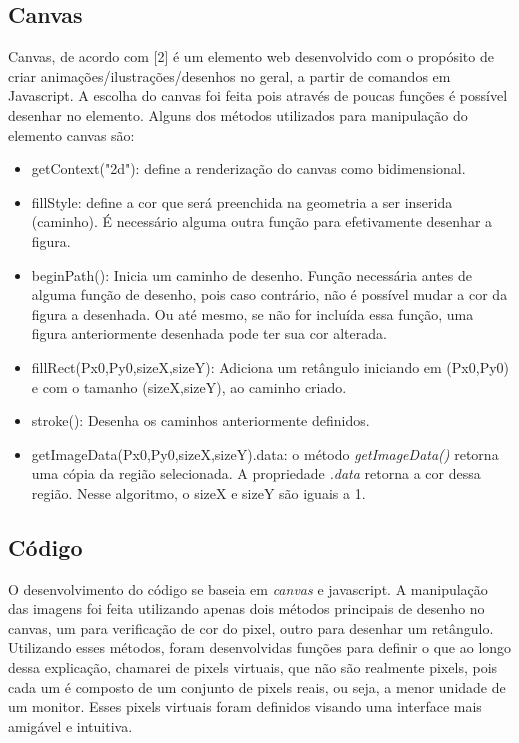 \documentclass[conference,harvard,brazil,english]{sbatex}
\begin{document}
\subsection{Canvas}
Canvas, de acordo com [2] é um elemento web desenvolvido com o propósito de criar animações/ilustrações/desenhos no geral, a partir de comandos em Javascript. A escolha do canvas foi feita pois através de poucas funções é possível desenhar no elemento.
Alguns dos métodos utilizados para manipulação do elemento canvas são:
\begin{itemize}
\item getContext("2d"): define a renderização do canvas como bidimensional.
\item fillStyle: define a cor que será preenchida na geometria a ser inserida (caminho). É necessário alguma outra função para efetivamente desenhar a figura.
\item beginPath(): Inicia um caminho de desenho. Função necessária antes de alguma função de desenho, pois caso contrário, não é possível mudar a cor da figura a desenhada. Ou até mesmo, se não for incluída essa função, uma figura anteriormente desenhada pode ter sua cor alterada. 
\item fillRect(Px0,Py0,sizeX,sizeY): Adiciona um retângulo iniciando em (Px0,Py0) e com o tamanho (sizeX,sizeY), ao caminho criado.
\item stroke(): Desenha os caminhos anteriormente definidos.
\item getImageData(Px0,Py0,sizeX,sizeY).data: o método \textit{getImageData()} retorna uma cópia da região selecionada. A propriedade \textit{.data} retorna a cor dessa região. Nesse algoritmo, o sizeX e sizeY são iguais a 1.

\end{itemize}


\subsection{Código}
O desenvolvimento do código se baseia em \textit{canvas} e javascript.
A manipulação das imagens foi feita utilizando apenas dois métodos principais de desenho no canvas, um para verificação de cor do pixel, outro para desenhar um retângulo. Utilizando esses métodos, foram desenvolvidas funções para definir o que ao longo dessa explicação, chamarei de pixels virtuais, que não são realmente pixels, pois cada um é composto de um conjunto de pixels reais, ou seja, a menor unidade de um monitor. Esses pixels virtuais foram definidos visando uma interface mais amigável e intuitiva.
\end{document}
